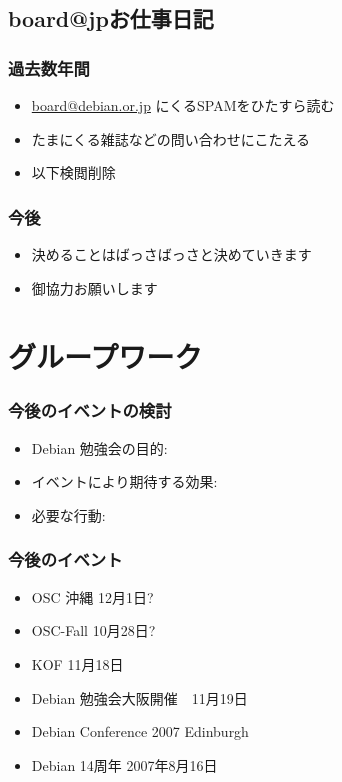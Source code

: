 \documentclass[cjk,dvipdfmx]{beamer}
\begin{document}
\subsection{board@jpお仕事日記}
\begin{frame}
 \frametitle{過去数年間}
 \begin{itemize}[<+->]
  \item \url{board@debian.or.jp} にくるSPAMをひたすら読む
  \item たまにくる雑誌などの問い合わせにこたえる
  \item 以下検閲削除
 \end{itemize}
\end{frame}

\begin{frame}
 \frametitle{今後}
 \begin{itemize}[<+->]
  \item 決めることはばっさばっさと決めていきます
  \item 御協力お願いします
 \end{itemize}
\end{frame}


\frame{\titlepage{}}

\section{グループワーク}

\begin{frame}
 \frametitle{今後のイベントの検討}
 \begin{itemize}
  \item Debian 勉強会の目的:
  \item イベントにより期待する効果:
  \item 必要な行動:
 \end{itemize}
\end{frame}

\begin{frame}
 \frametitle{今後のイベント}
 \begin{itemize}
  \item OSC 沖縄 12月1日?
  \item OSC-Fall 10月28日? 
  \item KOF 11月18日
  \item Debian 勉強会大阪開催　11月19日
  \item Debian Conference 2007 Edinburgh
  \item Debian 14周年 2007年8月16日
 \end{itemize}
\end{frame}
\end{document}
